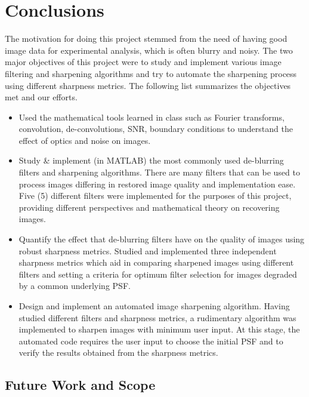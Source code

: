 
\section{Conclusions}
The motivation for doing this project stemmed from the need of having good image data for experimental analysis, which is often blurry and noisy. The two major objectives of this project were to study and implement various image filtering and sharpening algorithms and try to automate the sharpening process using different sharpness metrics. The following list summarizes the objectives met and our efforts.

\begin{itemize}
\item Used the mathematical tools learned in class such as Fourier transforms, convolution, de-convolutions, SNR, boundary conditions to understand the effect of optics and noise on images.

\item Study \& implement (in MATLAB) the most commonly used de-blurring filters and sharpening algorithms. There are many filters that can be used to process images differing in restored image quality and implementation ease. Five (5) different filters were implemented for the purposes of this project, providing different perspectives and mathematical theory on recovering images.

\item Quantify the effect that de-blurring filters have on the quality of images using robust sharpness metrics. Studied and implemented three independent sharpness metrics which aid in comparing sharpened images using different filters and setting a criteria for optimum filter selection for images degraded by a common underlying PSF.

\item Design and implement an automated image sharpening algorithm. Having studied different filters and sharpness metrics, a rudimentary algorithm was implemented to sharpen images with minimum user input. At this stage, the automated code requires the user input to choose the initial PSF and to verify the results obtained from the sharpness metrics. 
\end{itemize}

\subsection{ Future Work and Scope }

